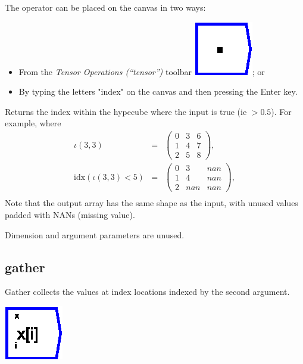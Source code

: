 The operator can be placed on the canvas in two ways:
\begin{itemize}
\item From the \emph{Tensor Operations (``tensor'')} toolbar \includegraphics{images/innerProduct};
or 
\item By typing the letters "index" on the canvas and then pressing the
Enter key.
\end{itemize}
Returns the index within the hypecube where the input is true (ie
$>0.5$). For example, where 
\begin{eqnarray*}
\iota(3,3) & = & \left(\begin{array}{ccc}
0 & 3 & 6\\
1 & 4 & 7\\
2 & 5 & 8
\end{array}\right),\\
\mathrm{idx}(\iota(3,3)<5) & = & \left(\begin{array}{ccc}
0 & 3 & nan\\
1 & 4 & nan\\
2 & nan & nan
\end{array}\right),\\
\end{eqnarray*}
Note that the output array has the same shape as the input, with unused
values padded with NANs (missing value).

Dimension and argument parameters are unused.

\subsection{gather}

\label{Operation:gather}

Gather collects the values at index locations indexed by the second
argument.

\includegraphics{images/gather}

